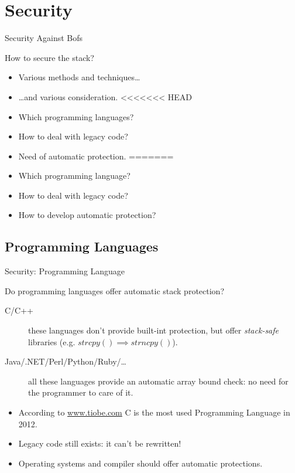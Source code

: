 \section{Security}
\begin{frame}{Security Against Bofs}
	\begin{block}{How to secure the stack?}
		\begin{itemize}
			\item Various methods and techniques\ldots
			\item \ldots{}and various consideration.
<<<<<<< HEAD
			\item Which programming languages?
			\item How to deal with legacy code?
			\item Need of automatic protection.
=======
			\item Which programming language?
			\item How to deal with legacy code?
			\item How to develop automatic protection?
		\end{itemize}
	\end{block}
\end{frame}

\subsection{Programming Languages}
\begin{frame}{Security: Programming Language}
	\begin{block}{Do programming languages offer automatic stack protection?}
		\begin{description}
			\item[C/C++]these languages don't provide built-int protection, but offer
				\emph{stack-safe} libraries (e.g. $strcpy() \implies strncpy()$).
			\item[Java/.NET/Perl/Python/Ruby/\ldots]all these languages provide an
				automatic array bound check: no need for the programmer to care of it.
		\end{description}
		\begin{itemize}
			\item According to \url{www.tiobe.com} C is the most used Programming Language in 2012.
			\item \alert{Legacy code still exists: it can't be rewritten!}
			\item Operating systems and compiler should offer automatic protections.
		\end{itemize}
	\end{block}
\end{frame}


